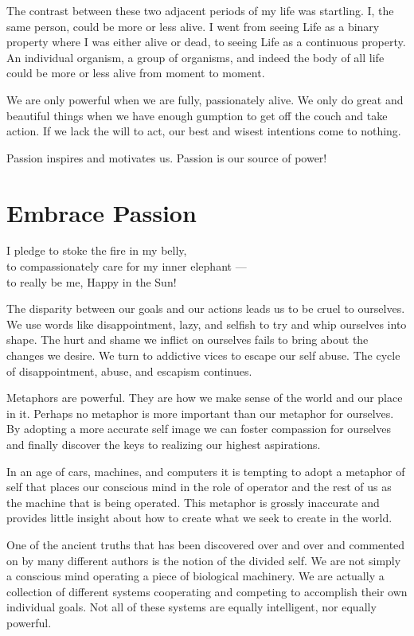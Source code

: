 \documentclass[ebook,12pt,openany,twoside]{memoir}
\newcommand{\imagefacingchapter}[1]{
  \cleartoverso
  \clearpage \null
  \thispagestyle{cleared}
  \AddToShipoutPictureBG*{%
    \AtStockLowerLeft{%
      \texttt{[image: \#1]}
    }
  }
  \clearpage
}
\begin{document}
The contrast between these two adjacent periods of my life was startling. I,
the same person, could be more or less alive. I went from seeing Life as a
binary property where I was either alive or dead, to seeing Life as a
continuous property. An individual organism, a group of organisms, and indeed
the body of all life could be more or less alive from moment to moment.

We are only powerful when we are fully, passionately alive. We only do great
and beautiful things when we have enough gumption to get off the couch and take
action. If we lack the will to act, our best and wisest intentions come to nothing.

Passion inspires and motivates us. Passion is our source of power!




\imagefacingchapter{images/EmbracePassion}
\chapter{Embrace Passion}
\setlength\epigraphwidth{3.4in}
\epigraph{
  I pledge to stoke the fire in my belly,\\
  to compassionately care for my inner elephant ---\\
  to really be me, Happy in the Sun!
}{}

\noindent The disparity between our goals and our actions leads us to be cruel
to ourselves. We use words like disappointment, lazy, and selfish to try and
whip ourselves into shape. The hurt and shame we inflict on ourselves fails to
bring about the changes we desire. We turn to addictive vices to escape our
self abuse.  The cycle of disappointment, abuse, and escapism continues.

Metaphors are powerful. They are how we make sense of the world and our place
in it. Perhaps no metaphor is more important than our metaphor for ourselves.
By adopting a more accurate self image we can foster compassion for ourselves
and finally discover the keys to realizing our highest aspirations.

In an age of cars, machines, and computers it is tempting to adopt a metaphor
of self that places our conscious mind in the role of operator and the rest of
us as the machine that is being operated. This metaphor is grossly inaccurate
and provides little insight about how to create what we seek to create in the
world.

One of the ancient truths that has been discovered over and over and commented
on by many different authors is the notion of the divided self. We are not
simply a conscious mind operating a piece of biological machinery. We are
actually a collection of different systems cooperating and competing to
accomplish their own individual goals. Not all of these systems are equally
intelligent, nor equally powerful.
\end{document}
